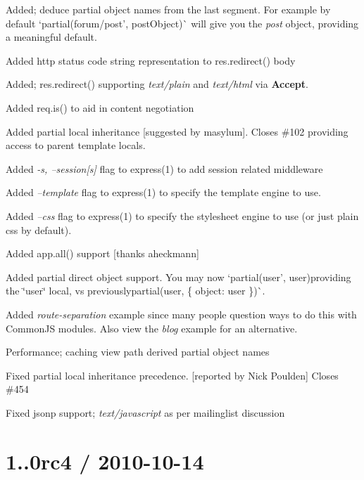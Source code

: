 {\ttfamily 
\begin{DoxyItemize}
\item Added; deduce partial object names from the last segment. For example by default `partial(\textquotesingle{}forum/post', post\+Object)\`{} will give you the {\itshape post} object, providing a meaningful default.
\item Added http status code string representation to {\ttfamily res.\+redirect()} body
\item Added; {\ttfamily res.\+redirect()} supporting {\itshape text/plain} and {\itshape text/html} via {\bfseries Accept}.
\item Added {\ttfamily req.\+is()} to aid in content negotiation
\item Added partial local inheritance \mbox{[}suggested by masylum\mbox{]}. Closes \#102 providing access to parent template locals.
\item Added {\itshape -\/s, --session\mbox{[}s\mbox{]}} flag to express(1) to add session related middleware
\item Added {\itshape --template} flag to express(1) to specify the template engine to use.
\item Added {\itshape --css} flag to express(1) to specify the stylesheet engine to use (or just plain css by default).
\item Added {\ttfamily app.\+all()} support \mbox{[}thanks aheckmann\mbox{]}
\item Added partial direct object support. You may now `partial(\textquotesingle{}user', user){\ttfamily providing the \char`\"{}user\char`\"{} local, vs previously}partial(\textquotesingle{}user\textquotesingle{}, \{ object\+: user \})\`{}.
\item Added {\itshape route-\/separation} example since many people question ways to do this with Common\+JS modules. Also view the {\itshape blog} example for an alternative.
\item Performance; caching view path derived partial object names
\item Fixed partial local inheritance precedence. \mbox{[}reported by Nick Poulden\mbox{]} Closes \#454
\item Fixed jsonp support; {\itshape text/javascript} as per mailinglist discussion
\end{DoxyItemize}}

{\ttfamily \section*{1..\+0rc4 / 2010-\/10-\/14 }}

